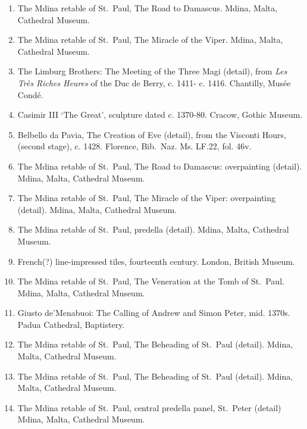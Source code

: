 \documentclass[a4paper,12pt]{article}
\begin{document}
\begin{enumerate}
\item %
The Mdina retable of St.~Paul, The Road to Damascus.  Mdina, Malta,
Cathedral Museum.

\item %
The Mdina retable of St.~Paul, The Miracle of the Viper.  Mdina,
Malta, Cathedral Museum.

\item %
The Limburg Brothers: The Meeting of the Three Magi (detail), from
\textit{Les Tr\`es Riches Heures} of the Duc de Berry, c. 1411-
c. 1416. Chantilly, Mus\'ee Cond\'e.

\item %
Casimir III `The Great', sculpture dated c. 1370-80.  Cracow, Gothic
Museum.

\item %
Belbello da Pavia, The Creation of Eve (detail), from the Visconti
Hours,(second stage), c. 1428.  Florence, Bib.~Naz. Ms. LF.22,
fol. 46v.

\item %
The Mdina retable of St.~Paul, The Road to Damascus: overpainting
(detail).  Mdina, Malta, Cathedral Museum.

\item %
The Mdina retable of St.~Paul, The Miracle of the Viper: overpainting
(detail).  Mdina, Malta, Cathedral Museum.

\item %
The Mdina retable of St.~Paul, predella (detail).  Mdina, Malta,
Cathedral Museum.

\item %
French(?) line-impressed tiles, fourteenth century.  London, British
Museum.

\item %
The Mdina retable of St.~Paul, The Veneration at the Tomb of St.~Paul.
Mdina, Malta, Cathedral Museum.

\item %
Giusto de'Menabuoi: The Calling of Andrew and Simon Peter, mid. 1370s.
Padua Cathedral, Baptistery.

\item %
The Mdina retable of St.~Paul, The Beheading of St.~Paul (detail).
Mdina, Malta, Cathedral Museum.

\item %
The Mdina retable of St.~Paul, The Beheading of St.~Paul (detail).
Mdina, Malta, Cathedral Museum.

\item %
The Mdina retable of St.~Paul, central predella panel, St.~Peter
(detail) Mdina, Malta, Cathedral Museum.

\end{enumerate}

\end{document}
